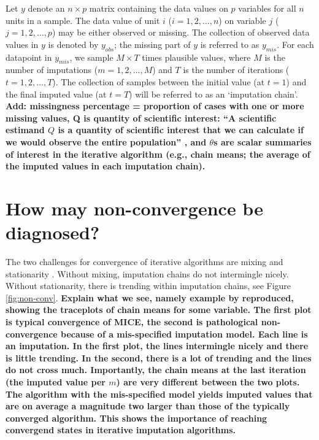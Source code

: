 \documentclass[Royal,times,sageh]{sagej}
\begin{document}
Let \(y\) denote an \(n \times p\) matrix containing the data values on
\(p\) variables for all \(n\) units in a sample. The data value of unit
\(i\) (\(i = 1, 2, \dots, n\)) on variable \(j\)
(\(j = 1, 2, \dots, p\)) may be either observed or missing. The
collection of observed data values in \(y\) is denoted by \(y_{obs}\);
the missing part of \(y\) is referred to as \(y_{mis}\). For each
datapoint in \(y_{mis}\), we sample \(M \times T\) times plausible
values, where \(M\) is the number of imputations
(\(m = 1, 2, \dots, M\)) and \(T\) is the number of iterations
(\(t = 1, 2, \dots, T\)). The collection of samples between the initial
value (at \(t=1\)) and the final imputed value (at \(t=T\)) will be
referred to as an `imputation chain'. \textbf{Add: missingness
percentage = proportion of cases with one or more missing values, Q is
quantity of scientific interest: ``A scientific estimand \(Q\) is a
quantity of scientific interest that we can calculate if we would
observe the entire population'' \citep[par 2.3.1]{buur18}, and
\(\theta\)s are scalar summaries of interest in the iterative algorithm
(e.g., chain means; the average of the imputed values in each imputation
chain). }

\hypertarget{how-may-non-convergence-be-diagnosed}{%
\section{How may non-convergence be
diagnosed?}\label{how-may-non-convergence-be-diagnosed}}

The two challenges for convergence of iterative algorithms are mixing
and stationarity \citep{gelm13}. Without mixing, imputation chains do
not intermingle nicely. Without stationarity, there is trending within
imputation chains, see Figure \ref{fig:non-conv}. \textbf{Explain what
we see, namely example by \citet{buur18} reproduced, showing the
traceplots of chain means for some variable. The first plot is typical
convergence of MICE, the second is pathological non-convergence because
of a mis-specified imputation model. Each line is an imputation. In the
first plot, the lines intermingle nicely and there is little trending.
In the second, there is a lot of trending and the lines do not cross
much. Importantly, the chain means at the last iteration (the imputed
value per \(m\)) are very different between the two plots. The algorithm
with the mis-specified model yields imputed values that are on average a
magnitude two larger than those of the typically converged algorithm.
This shows the importance of reaching convergend states in iterative
imputation algorithms.}
\end{document}

